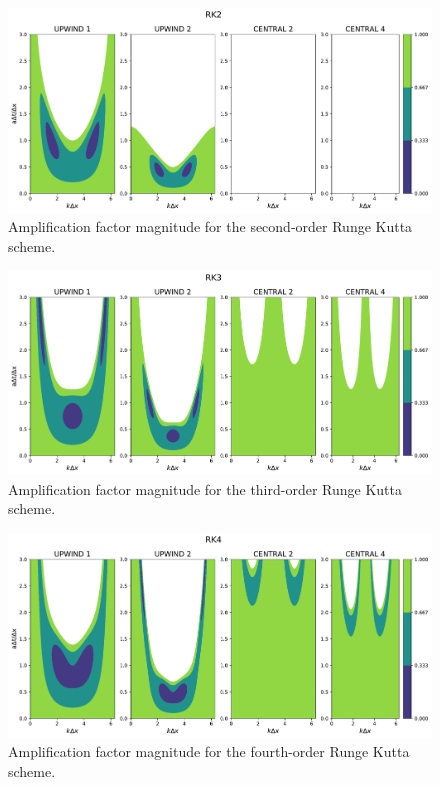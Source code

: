 \documentclass{article}
\begin{document}
\begin{figure}[htbp]
    \centering
    \includegraphics[width=0.8\linewidth]{./vn_rk2.pdf} %
    \caption{Amplification factor magnitude for the second-order Runge Kutta scheme.}
    \label{fig:vn_rk2} %
\end{figure}

\begin{figure}[htbp]
    \centering
    \includegraphics[width=0.8\linewidth]{./vn_rk3.pdf} %
    \caption{Amplification factor magnitude for the third-order Runge Kutta scheme.}
    \label{fig:vn_rk3} %
\end{figure}

\begin{figure}[htbp]
    \centering
    \includegraphics[width=0.8\linewidth]{./vn_rk4.pdf} %
    \caption{Amplification factor magnitude for the fourth-order Runge Kutta scheme.}
    \label{fig:vn_rk4} %
\end{figure}








\end{document}
